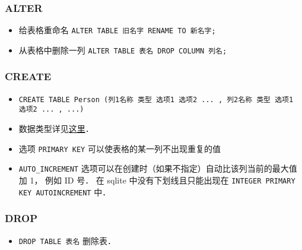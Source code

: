 \subsubsection{ALTER}
\begin{itemize}
\item 给表格重命名 \verb|ALTER TABLE 旧名字 RENAME TO 新名字;|
\item 从表格中删除一列 \verb|ALTER TABLE 表名 DROP COLUMN 列名;|
\end{itemize}

\subsubsection{CREATE}
\begin{itemize}
\item \verb|CREATE TABLE Person (列1名称 类型 选项1 选项2 ... , 列2名称 类型 选项1 选项2 ... , ...)|
\item 数据类型详见\href{https://www.w3schools.com/sql/sql_datatypes.asp}{这里}．
\item 选项 \verb|PRIMARY KEY| 可以使表格的某一列不出现重复的值 %
\item \verb|AUTO_INCREMENT| 选项可以在创建时（如果不指定）自动比该列当前的最大值加 1， 例如 ID 号． 在 sqlite 中没有下划线且只能出现在 \verb|INTEGER PRIMARY KEY AUTOINCREMENT| 中．
\end{itemize}

\subsubsection{DROP}
\begin{itemize}
\item \verb|DROP TABLE 表名| 删除表．
\end{itemize}

